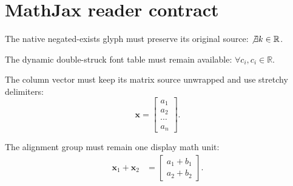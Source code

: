 \documentclass{article}
\begin{document}
\section{MathJax reader contract}

The native negated-exists glyph must preserve its original source:
$\not\exists k\in\mathbb{R}$.

The dynamic double-struck font table must remain available:
$\forall c_i, c_i\in\mathbb{R}$.

The column vector must keep its matrix source unwrapped and use stretchy delimiters:
\[
\mathbf{x}=\begin{bmatrix}
a_1\\
a_2\\
\cdots\\
a_n
\end{bmatrix}.
\]

The alignment group must remain one display math unit:
\begin{align*}
\mathbf{x}_1+\mathbf{x}_2 &= \begin{bmatrix}a_1+b_1\\a_2+b_2\end{bmatrix}.
\end{align*}
\end{document}
